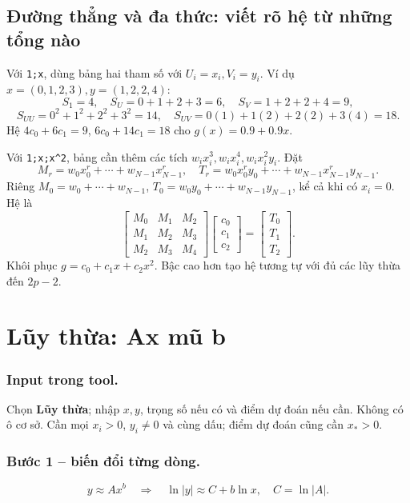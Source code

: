 \subsection{Đường thẳng và đa thức: viết rõ hệ từ những tổng nào}
Với \texttt{1;x}, dùng bảng hai tham số với $U_i=x_i,V_i=y_i$. Ví dụ $x=(0,1,2,3),y=(1,2,2,4)$:
\[
S_1=4,\quad S_U=0+1+2+3=6,\quad S_V=1+2+2+4=9,
\]
\[
S_{UU}=0^2+1^2+2^2+3^2=14,\quad S_{UV}=0(1)+1(2)+2(2)+3(4)=18.
\]
Hệ $4c_0+6c_1=9$, $6c_0+14c_1=18$ cho $g(x)=0.9+0.9x$.

Với \texttt{1;x;x\^{}2}, bảng cần thêm các tích $w_ix_i^3,w_ix_i^4,w_ix_i^2y_i$. Đặt
\[
M_r=w_0x_0^r+\cdots+w_{N-1}x_{N-1}^r,\quad
T_r=w_0x_0^ry_0+\cdots+w_{N-1}x_{N-1}^ry_{N-1}.
\]
Riêng $M_0=w_0+\cdots+w_{N-1}$, $T_0=w_0y_0+\cdots+w_{N-1}y_{N-1}$, kể cả khi có $x_i=0$. Hệ là
\[
\begin{bmatrix}M_0&M_1&M_2\\M_1&M_2&M_3\\M_2&M_3&M_4\end{bmatrix}
\begin{bmatrix}c_0\\c_1\\c_2\end{bmatrix}=\begin{bmatrix}T_0\\T_1\\T_2\end{bmatrix}.
\]
Khôi phục $g=c_0+c_1x+c_2x^2$. Bậc cao hơn tạo hệ tương tự với đủ các lũy thừa đến $2p-2$.



\examplebreak
\section{Lũy thừa: Ax mũ b}

\label{sec:ls-power}

\subsubsection*{Input trong tool.} Chọn \textbf{Lũy thừa}; nhập $x,y$, trọng số nếu có và điểm dự đoán nếu cần. Không có ô cơ sở. Cần mọi $x_i>0$, $y_i\ne0$ và cùng dấu; điểm dự đoán cũng cần $x_*>0$.

\subsubsection*{Bước 1 -- biến đổi từng dòng.}\[y\approx Ax^b\quad\Longrightarrow\quad\ln|y|\approx C+b\ln x,\quad C=\ln|A|.\]


